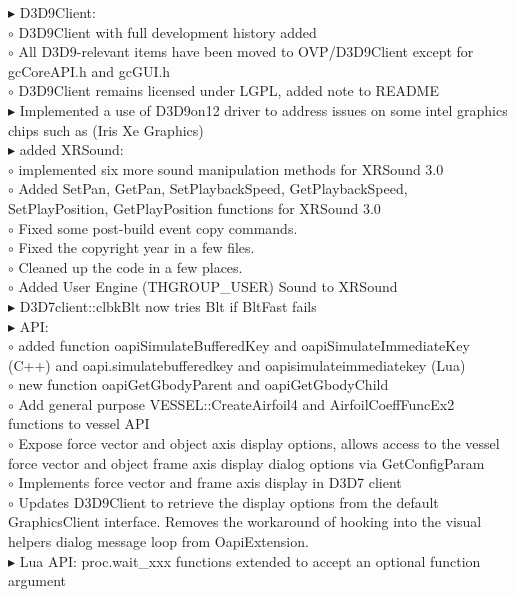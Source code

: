 \documentclass[Orbiter User Manual.tex]{subfiles}
\begin{document}
\begin{sloppypar}%
$\blacktriangleright$ D3D9Client:\\
$\circ$ D3D9Client with full development history added\\
$\circ$ All D3D9-relevant items have been moved to OVP/D3D9Client except for gcCoreAPI.h and gcGUI.h\\
$\circ$ D3D9Client remains licensed under LGPL, added note to README\\
$\blacktriangleright$ Implemented a use of D3D9on12 driver to address issues on some intel graphics chips such as (Iris Xe Graphics)\\
$\blacktriangleright$ added XRSound:\\
$\circ$ implemented six more sound manipulation methods for XRSound 3.0\\
$\circ$ Added SetPan, GetPan, SetPlaybackSpeed, GetPlaybackSpeed, SetPlayPosition, GetPlayPosition functions for XRSound 3.0\\
$\circ$ Fixed some post-build event copy commands.\\
$\circ$ Fixed the copyright year in a few files.\\
$\circ$ Cleaned up the code in a few places.\\
$\circ$ Added User Engine (THGROUP\_USER) Sound to XRSound\\
$\blacktriangleright$ D3D7client::clbkBlt now tries Blt if BltFast fails\\
$\blacktriangleright$ API:\\
$\circ$ added function oapiSimulateBufferedKey and oapiSimulateImmediateKey (C++) and oapi.simulatebufferedkey and oapisimulateimmediatekey (Lua)\\
$\circ$ new function oapiGetGbodyParent and oapiGetGbodyChild\\
$\circ$ Add general purpose VESSEL::CreateAirfoil4 and AirfoilCoeffFuncEx2 functions to vessel API\\
$\circ$ Expose force vector and object axis display options, allows access to the vessel force vector and object frame axis display dialog options via GetConfigParam\\
$\circ$ Implements force vector and frame axis display in D3D7 client\\
$\circ$ Updates D3D9Client to retrieve the display options from the default GraphicsClient interface. Removes the workaround of hooking into the visual helpers dialog message loop from OapiExtension.\\
$\blacktriangleright$ Lua API: proc.wait\_xxx functions extended to accept an optional function argument\\

\end{sloppypar}
\end{document}
